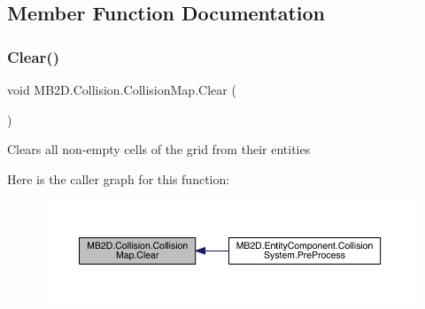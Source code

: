 \subsection{Member Function Documentation}
\hypertarget{class_m_b2_d_1_1_collision_1_1_collision_map_ac7eeef6db2deadf738ea40ff939759ff}{}\label{class_m_b2_d_1_1_collision_1_1_collision_map_ac7eeef6db2deadf738ea40ff939759ff} 
\subsubsection{\texorpdfstring{Clear()}{Clear()}}
{\footnotesize\ttfamily void M\+B2\+D.\+Collision.\+Collision\+Map.\+Clear (\begin{DoxyParamCaption}{ }\end{DoxyParamCaption})\hspace{0.3cm}{\ttfamily [inline]}}



Clears all non-\/empty cells of the grid from their entities 

Here is the caller graph for this function\+:
\nopagebreak
\begin{figure}[H]
\begin{center}
\leavevmode
\includegraphics[width=350pt]{class_m_b2_d_1_1_collision_1_1_collision_map_ac7eeef6db2deadf738ea40ff939759ff_icgraph}
\end{center}
\end{figure}
\hypertarget{class_m_b2_d_1_1_collision_1_1_collision_map_acbc6d9d9bb85342cf8f07c22f6947b27}{}\label{class_m_b2_d_1_1_collision_1_1_collision_map_acbc6d9d9bb85342cf8f07c22f6947b27} 
